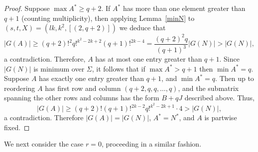 \documentclass{daj}
\theoremstyle{plain}
\theoremstyle{definition}
\begin{document}
\begin{proof}
\vspace{11pt} Suppose $\max A^*\geq q+2$. If $A^*$ has more than one element greater than $q+1$ (counting multiplicity), then applying Lemma~\ref{minN} to $(s,t,X)=(lk,k^2,[(2,q+2)])$ we deduce that $$|G(A)|\geq (q+2)!^2q!^{k^2-2k+2}(q+1)!^{2k-4}=\frac{(q+2)^2q}{(q+1)^3}|G(N)|>|G(N)|,$$ a contradiction. Therefore, $A$ has at most one entry greater than $q+1$. Since $|G(N)|$ is minimum over $\Sigma$, it follows that if $\max A^*>q+1$ then $\min A^*= q$. Suppose $A$ has exactly one entry greater than $q+1$, and $\min A^*=q$. Then up to reordering $A$ has first row and column $(q+2,q,q,\dots,q)$, and the submatrix spanning the other rows and columns has the form $B+qJ$ described above. Thus, $$|G(A)|\geq(q+2)!(q+1)!^{2k-2}q!^{k^2-2k+1}\cdot 4>|G(N)|,$$ a contradiction. Therefore $|G(A)|=|G(N)|$, $A^*=N^*$, and $A$ is partwise fixed. 
\end{proof}
We next consider the case $r=0$, proceeding in a similar fashion.
\end{document}
